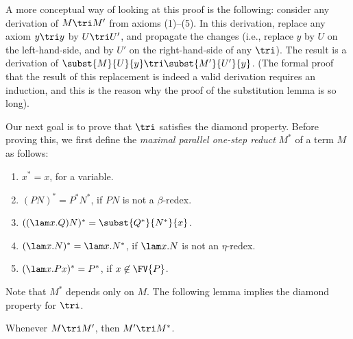 \documentclass[12pt]{article}
\begin{document}
A more conceptual way of looking at this proof is the following:
consider any derivation of $M\tri M'$ from axioms (1)--(5). In this
derivation, replace any axiom $y\tri y$ by $U\tri U'$, and propagate
the changes (i.e., replace $y$ by $U$ on the left-hand-side, and by
$U'$ on the right-hand-side of any $\tri$). The result is a derivation
of $\subst{M}{U}{y}\tri\subst{M'}{U'}{y}$. (The formal proof that the
result of this replacement is indeed a valid derivation requires an
induction, and this is the reason why the proof of the substitution
lemma is so long).

Our next goal is to prove that $\tri$ satisfies the diamond
property. Before proving this, we first define the {\em maximal
  parallel one-step reduct} $M^*$ of a term $M$ as follows:

\begin{enumerate}
\item $x^* = x$, for a variable.
\item $(PN)^* = P^*N^*$, if $PN$ is not a $\beta$-redex. 
\item $((\lam x.Q)N)^* = \subst{Q^*}{N^*}{x}$.
\item $(\lam x.N)^* = \lam x.N^*$, if $\lam x.N$ is not an 
        $\eta$-redex.
\item $(\lam x.Px)^* = P^*$, if $x\not\in\FV{P}$.
\end{enumerate}

Note that $M^*$ depends only on $M$.  The following lemma implies the
diamond property for $\tri$.

\begin{lemma}
\label{lem-max-par}
  Whenever $M \tri M'$, then $M' \tri M^*$.
\end{lemma}
\end{document}
